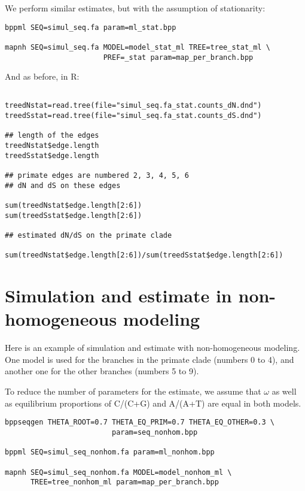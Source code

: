 \documentclass[11pt, a4paper]{article}
\begin{document}
{We perform similar estimates, but with the assumption of
stationarity:

\begin{verbatim}
bppml SEQ=simul_seq.fa param=ml_stat.bpp

mapnh SEQ=simul_seq.fa MODEL=model_stat_ml TREE=tree_stat_ml \
                       PREF=_stat param=map_per_branch.bpp

\end{verbatim}

And as before, in R:

\begin{verbatim}

treedNstat=read.tree(file="simul_seq.fa_stat.counts_dN.dnd")  
treedSstat=read.tree(file="simul_seq.fa_stat.counts_dS.dnd")  

## length of the edges 
treedNstat$edge.length
treedSstat$edge.length

## primate edges are numbered 2, 3, 4, 5, 6
## dN and dS on these edges

sum(treedNstat$edge.length[2:6])
sum(treedSstat$edge.length[2:6])

## estimated dN/dS on the primate clade

sum(treedNstat$edge.length[2:6])/sum(treedSstat$edge.length[2:6])

\end{verbatim}


\section*{Simulation and estimate in non-homogeneous modeling}

Here is an example of simulation and estimate with non-homogeneous
modeling. One model is used for the branches in the primate clade
(numbers 0 to 4), and another one for the other branches (numbers 5 to
9).

To reduce the number of parameters for the estimate, we assume that
$\omega$ as well as equilibrium proportions of C/(C+G) and A/(A+T) are
equal in both models.

\begin{verbatim}
bppseqgen THETA_ROOT=0.7 THETA_EQ_PRIM=0.7 THETA_EQ_OTHER=0.3 \
                         param=seq_nonhom.bpp

bppml SEQ=simul_seq_nonhom.fa param=ml_nonhom.bpp

mapnh SEQ=simul_seq_nonhom.fa MODEL=model_nonhom_ml \
      TREE=tree_nonhom_ml param=map_per_branch.bpp
 

\end{verbatim}}
\end{document}
